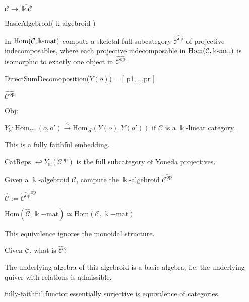 
$\mathcal{C} \rightarrow \widehat{\Bbbk\mathcal{C}}$


BasicAlgebroid( k-algebroid )

In $\mathrm{Hom}(\mathcal{C},\Bbbk\textnormal{-}\mathrm{mat})$ compute a skeletal full subcategory
$\widehat{\mathcal{C}^{\mathrm{op}}}$ of projective indecomposables,
where each projective indecomposable in $\mathrm{Hom}(\mathcal{C},\Bbbk\textnormal{-}\mathrm{mat})$ is isomorphic to exactly one
object in $\widehat{\mathcal{C}^{\mathrm{op}}}$.

DirectSumDecomoposition($Y(o)$) = [ p1,...,pr ]

$\widehat{\mathcal{C}^{\mathrm{op}}}$

$\mathrm{Obj}$: 

$Y_{\Bbbk} : \mathrm{Hom}_{\mathcal{C}^{\mathrm{op}}}(o,o') \xrightarrow{\sim} \mathrm{Hom}_\mathcal{A} (Y(o),Y(o'))$ if $\mathcal{C}$ is a $\Bbbk$-linear category.

This is a fully faithful embedding.

CatReps $\hookleftarrow Y_{\Bbbk}(\mathcal{C}^{\mathrm{op}})$ is the full subcategory of Yoneda projectives.

Given a $\Bbbk$-algebroid $\mathcal{C}$, compute the $\Bbbk$-algebroid $\widehat{\mathcal{C}^{\mathrm{op}}}$ 

$\widehat{\mathcal{C}} := \widehat{\mathcal{C}^{\mathrm{op}}}^{\mathrm{op}}$

$\mathrm{Hom}(\widehat{\mathcal{C}},\Bbbk\mathrm{-mat}) \simeq \mathrm{Hom}(\mathcal{C},\Bbbk\mathrm{-mat})$

This equivalence ignores the monoidal structure.

Given $\mathcal{C}$, what is $\widehat{\mathcal{C}}$?

The underlying algebra of this algebroid is a basic algebra, i.e. the underlying quiver with relations is admissible.

fully-faithful functor essentially surjective is equivalence of categories.